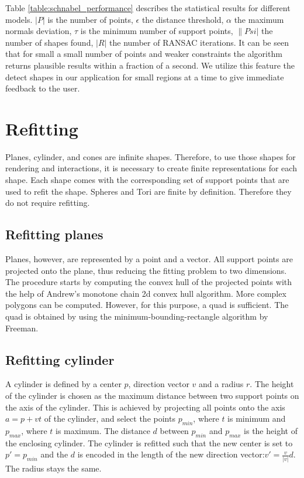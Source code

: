 Table \ref{table:schnabel_performance} describes the statistical results for different models. $|P|$ is the number of points, $\epsilon$ the distance threshold, $\alpha$ the maximum normals deviation, $\tau$ is the minimum number of support points, $\|Psi|$ the number of shapes found, $|R|$ the number of RANSAC iterations. It can be seen that for small a small number of points and weaker constraints the algorithm returns plausible results within a fraction of a second. We utilize this feature the detect shapes in our application for small regions at a time to give immediate feedback to the user. 


\section{Refitting}
\label{sec:Refitting}

Planes, cylinder, and cones are infinite shapes. Therefore, to use those shapes for rendering and interactions, it is necessary to create finite representations for each shape. Each shape comes with the corresponding set of support points that are used to refit the shape. Spheres and Tori are finite by definition. Therefore they do not require refitting. 


\subsection{Refitting planes}

Planes, however, are represented by a point and a vector. All support points are projected onto the plane, thus reducing the fitting problem to two dimensions. The procedure starts by computing the convex hull of the projected points with the help of Andrew's monotone chain 2d convex hull algorithm\cite{andrew1979another}. 
More complex polygons can be computed. However, for this purpose, a quad is sufficient. The quad is obtained by using the minimum-bounding-rectangle algorithm by Freeman\cite{freeman1975determining}. 


\subsection{Refitting cylinder}

A cylinder is defined by a center $p$, direction vector $v$ and a radius $r$. The height of the cylinder is chosen as the maximum distance between two support points on the axis of the cylinder. This is achieved by projecting all points onto the axis $a = p + vt$ of the cylinder, and select the points $p_{min}$, where $t$ is minimum and $p_{max}$, where $t$ is maximum. The distance $d$ between $p_{min}$ and $p_{max}$ is the height of the enclosing cylinder. The cylinder is refitted such that the new center is set to $p' = p_{min}$ and the $d$ is encoded in the length of the new direction vector:$v' = \frac{v}{|v|}d$. The radius stays the same. 



